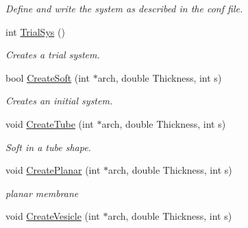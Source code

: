 \begin{DoxyCompactItemize}
\begin{DoxyCompactList}\small\item\em \-Define and write the system as described in the conf file. \end{DoxyCompactList}\item 
\hypertarget{classVarData_a918d18dfd9211a136328803d3a64a0e4}{int \hyperlink{classVarData_a918d18dfd9211a136328803d3a64a0e4}{\-Trial\-Sys} ()}\label{classVarData_a918d18dfd9211a136328803d3a64a0e4}

\begin{DoxyCompactList}\small\item\em \-Creates a trial system. \end{DoxyCompactList}\item 
\hypertarget{classVarData_a7e93821c1a3e32096733330e9e66c959}{bool \hyperlink{classVarData_a7e93821c1a3e32096733330e9e66c959}{\-Create\-Soft} (int $\ast$arch, double \-Thickness, int s)}\label{classVarData_a7e93821c1a3e32096733330e9e66c959}

\begin{DoxyCompactList}\small\item\em \-Creates an initial system. \end{DoxyCompactList}\item 
\hypertarget{classVarData_a79507647da2b91453687857ab20beb34}{void \hyperlink{classVarData_a79507647da2b91453687857ab20beb34}{\-Create\-Tube} (int $\ast$arch, double \-Thickness, int s)}\label{classVarData_a79507647da2b91453687857ab20beb34}

\begin{DoxyCompactList}\small\item\em \-Soft in a tube shape. \end{DoxyCompactList}\item 
\hypertarget{classVarData_a5eba4428e8514fc9034e40fef8c81b91}{void \hyperlink{classVarData_a5eba4428e8514fc9034e40fef8c81b91}{\-Create\-Planar} (int $\ast$arch, double \-Thickness, int s)}\label{classVarData_a5eba4428e8514fc9034e40fef8c81b91}

\begin{DoxyCompactList}\small\item\em planar membrane \end{DoxyCompactList}\item 
\hypertarget{classVarData_a13917660616306dcbb2d73689ed3267f}{void \hyperlink{classVarData_a13917660616306dcbb2d73689ed3267f}{\-Create\-Vesicle} (int $\ast$arch, double \-Thickness, int s)}\label{classVarData_a13917660616306dcbb2d73689ed3267f}


\end{DoxyCompactItemize}
